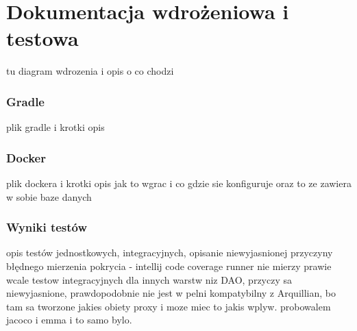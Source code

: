 \chapter{Dokumentacja wdrożeniowa i testowa}
tu diagram wdrozenia i opis o co chodzi

\subsection{Gradle}
plik gradle i krotki opis

\subsection{Docker}
plik dockera i krotki opis jak to wgrac i co gdzie sie konfiguruje oraz to ze zawiera w sobie baze danych

\subsection{Wyniki testów}
opis testów jednostkowych, integracyjnych, 
opisanie niewyjasnionej przyczyny błędnego mierzenia pokrycia - intellij code coverage runner nie mierzy prawie wcale testow integracyjnych dla innych warstw niz DAO, przyczy sa niewyjasnione, prawdopodobnie nie jest w pelni kompatybilny z Arquillian, bo tam sa tworzone jakies obiety proxy i moze miec to jakis wplyw. probowalem jacoco i emma i to samo bylo.